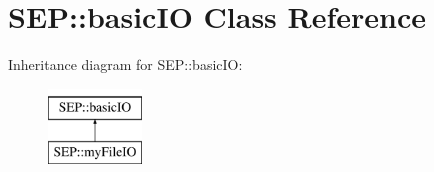 \hypertarget{class_s_e_p_1_1basic_i_o}{}\section{S\+EP\+:\+:basic\+IO Class Reference}
\label{class_s_e_p_1_1basic_i_o}
Inheritance diagram for S\+EP\+:\+:basic\+IO\+:\begin{figure}[H]
\begin{center}
\leavevmode
\includegraphics[height=2.000000cm]{class_s_e_p_1_1basic_i_o}
\end{center}
\end{figure}
